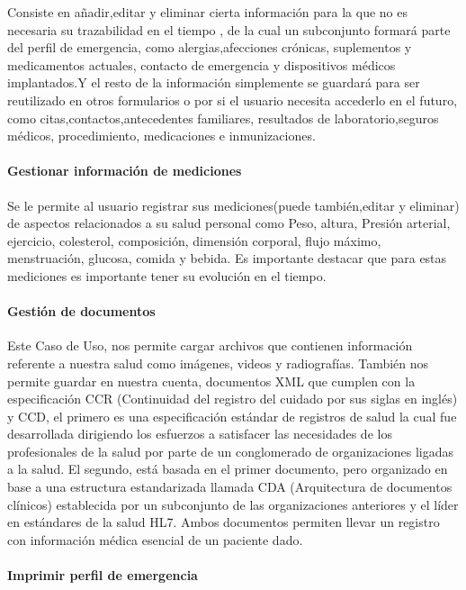 {Consiste en añadir,editar y eliminar cierta información para la que no es necesaria su trazabilidad en el tiempo , de la cual un subconjunto formará parte del perfil de emergencia, como alergias,afecciones crónicas, suplementos y medicamentos actuales, contacto de emergencia y dispositivos médicos implantados.Y el resto de la información simplemente se guardará para ser reutilizado en otros formularios o por si el usuario necesita accederlo en el futuro, como citas,contactos,antecedentes familiares, resultados de laboratorio,seguros médicos, procedimiento, medicaciones e inmunizaciones.
 
\paragraph{Gestionar información de mediciones}

Se le permite al usuario registrar sus mediciones(puede también,editar y eliminar) de aspectos relacionados a su salud personal como Peso, altura, Presión arterial, ejercicio, colesterol, composición, dimensión corporal, flujo máximo, menstruación, glucosa, comida y bebida. Es importante destacar que para estas mediciones es importante tener su evolución en el tiempo.

\paragraph{Gestión de documentos}

Este Caso de Uso, nos permite cargar archivos que contienen información referente a nuestra salud como imágenes, videos y radiografías. También nos permite guardar en nuestra cuenta, documentos XML que cumplen con la especificación CCR (Continuidad del registro del cuidado por sus siglas en inglés) y CCD, el primero es una especificación estándar de registros de salud la cual fue desarrollada dirigiendo los esfuerzos a satisfacer las necesidades de los profesionales de la salud por parte de un conglomerado de organizaciones ligadas a la salud. El segundo, está basada  en el primer documento, pero organizado en base a una estructura estandarizada llamada CDA (Arquitectura de documentos clínicos) establecida por un subconjunto de las organizaciones anteriores y el líder en estándares de la salud HL7. Ambos documentos permiten llevar un registro con información médica esencial de un paciente dado.
    
\paragraph{Imprimir perfil de emergencia}

}
